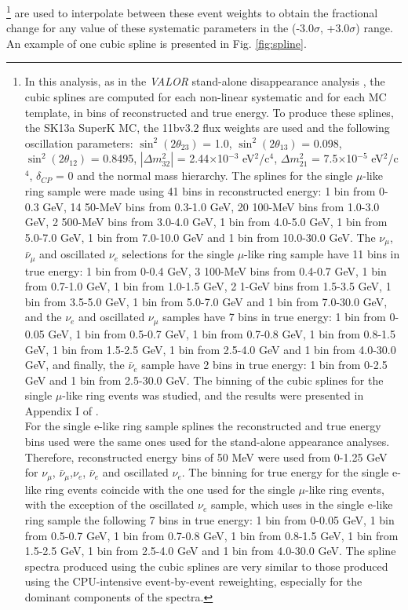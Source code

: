 \begin{enumerate}
\footnote{
  In this analysis, as in the \textit{VALOR} stand-alone disappearance analysis \cite{OurRun1234DisappAnalysis3Flavour},
 the cubic splines are computed for each non-linear systematic and for each MC template,
  in bins of reconstructed and true energy. To produce these splines, the SK13a SuperK MC, the 11bv3.2 flux weights are used and the following oscillation parameters: $\sin^{2}(2\theta_{23})$ = 1.0, $\sin^{2}(2\theta_{13})$ = 0.098, $\sin^{2}(2\theta_{12})$ = 0.8495, $|\Delta m^{2}_{32}|$ = 2.44$\times$10$^{-3}$ eV$^{2}$/c$^{4}$, $\Delta m^{2}_{21}$ = 7.5$\times$10$^{-5}$ eV$^{2}$/c$^{4}$, $\delta_{CP}$ = 0 and the normal mass hierarchy. 
The splines for the single $\mu$-like ring sample were made using 41 bins in reconstructed energy:
  1 bin from 0-0.3 GeV, 14 50-MeV bins from 0.3-1.0 GeV, 20 100-MeV bins from 1.0-3.0 GeV, 2 500-MeV bins from 3.0-4.0 GeV, 1 bin from 4.0-5.0 GeV, 1 bin from 5.0-7.0 GeV, 1 bin from 7.0-10.0 GeV and 1 bin from 10.0-30.0 GeV.
  The $\nu_{\mu}$, $\bar{\nu}_{\mu}$ and oscillated $\nu_{e}$ selections for the single $\mu$-like ring sample have 11 bins in true energy:
  1 bin from 0-0.4 GeV, 3 100-MeV bins from 0.4-0.7 GeV, 1 bin from 0.7-1.0 GeV, 1 bin from 1.0-1.5 GeV, 2 1-GeV bins from 1.5-3.5 GeV,  1 bin from 3.5-5.0 GeV, 1 bin from 5.0-7.0 GeV and 1 bin from 7.0-30.0 GeV, 
and the $\nu_{e}$ and oscillated $\nu_\mu$ samples have 7 bins in true energy:
  1 bin from 0-0.05 GeV, 1 bin from 0.5-0.7 GeV, 1 bin from 0.7-0.8 GeV,
  1 bin from 0.8-1.5 GeV, 1 bin from 1.5-2.5 GeV, 1 bin from 2.5-4.0 GeV and 1 bin from 4.0-30.0 GeV,
  and finally, the $\bar{\nu}_{e}$ sample have 2 bins in true energy:
  1 bin from 0-2.5 GeV and 1 bin from 2.5-30.0 GeV. The binning of the cubic splines for the single $\mu$-like ring events was studied, and the results were presented in Appendix I of \cite{OurRun123DisappAnalysis3Flavour}. \\
For the single e-like ring sample splines the reconstructed and true energy bins used were the same ones used for the
stand-alone appearance analyses. Therefore, reconstructed energy bins of 50 MeV were used from 0-1.25 GeV for $\nu_{\mu}$, $\bar{\nu}_{\mu}$,$\nu_{e}$, $\bar{\nu}_{e}$ and oscillated $\nu_{e}$. The binning for true energy for the single e-like ring events coincide with the one used for the single $\mu$-like ring events, with the exception of the oscillated $\nu_{e}$ sample, which uses in the single e-like ring sample the following 7 bins in true energy:
  1 bin from 0-0.05 GeV, 1 bin from 0.5-0.7 GeV, 1 bin from 0.7-0.8 GeV,
  1 bin from 0.8-1.5 GeV, 1 bin from 1.5-2.5 GeV, 1 bin from 2.5-4.0 GeV and 1 bin from 4.0-30.0 GeV.
  The spline spectra produced using the cubic splines are very similar to those produced using the CPU-intensive event-by-event reweighting, especially for the dominant components of the spectra. 
} are used to interpolate between these event weights 
to obtain the fractional change for any value of these systematic parameters in the (-3.0$\sigma$, +3.0$\sigma$) range.
An example of one cubic spline is presented in Fig. \ref{fig:spline}.\\


\end{enumerate}
